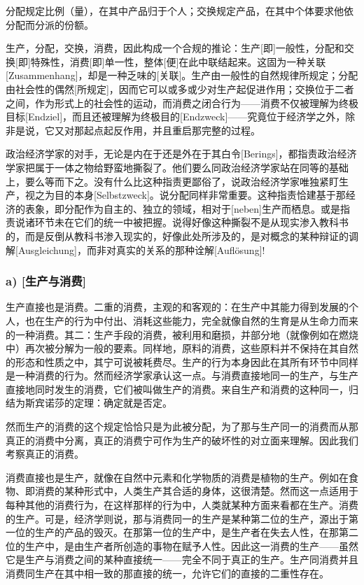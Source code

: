 \documentclass[a5paper,twoside,10.5pt]{ctexart}
\begin{document}
分配规定比例（量），在其中产品归于个人；交换规定产品，在其中个体要求他依分配而分派的份额。

生产，分配，交换，消费，因此构成一个合规的推论：生产[即]一般性，分配和交换[即]特殊性，消费[即]单一性，整体[便]在此中联结起来。这固为一种关联[Zusammenhang]，却是一种乏味的[关联]。生产由一般性的自然规律所规定；分配由社会性的偶然[所规定]，因而它可以或多或少对生产起促进作用；交换位于二者之间，作为形式上的社会性的运动，而消费之闭合行为——消费不仅被理解为终极目标[Endziel]，而且还被理解为终极目的[Endzweck]——究竟位于经济学之外，除非是说，它又对那起点起反作用，并且重启那完整的过程。

政治经济学家的对手，无论是内在于还是外在于其白令[Berings]，都指责政治经济学家把属于一体之物给野蛮地撕裂了。他们要么同政治经济学家站在同等的基础上，要么等而下之。没有什么比这种指责更鄙俗了，说政治经济学家唯独紧盯生产，视之为目的本身[Selbstzweck]。说分配同样非常重要。这种指责恰建基于那经济的表象，即分配作为自主的、独立的领域，相对于[neben]生产而栖息。或是指责说诸环节未在它们的统一中被把握。说得好像这种撕裂不是从现实渗入教科书的，而是反倒从教科书渗入现实的，好像此处所涉及的，是对概念的某种辩证的调解[Ausgleichung]，而非对真实的关系的那种诠解[Auflösung]!

\subsubsection{a) [生产与消费]}

生产直接也是消费。二重的消费，主观的和客观的：在生产中其能力得到发展的个人，也在生产的行为中付出、消耗这些能力，完全就像自然的生育是从生命力而来的一种消费。其二：生产手段的消费，被利用和磨损，并部分地（就像例如在燃烧中）再次被分解为一般的要素。同样地，原料的消费，这些原料并不保持在其自然的形态和性质之中，其宁可说被耗费尽。生产的行为本身因此在其所有环节中同样是一种消费的行为。然而经济学家承认这一点。与消费直接地同一的生产，与生产直接地同时发生的消费，它们被叫做生产的消费。来自生产和消费的这种同一，归结为斯宾诺莎的定理：确定就是否定。

然而生产的消费的这个规定恰恰只是为此被分配，为了那与生产同一的消费而从那真正的消费中分离，真正的消费宁可作为生产的破坏性的对立面来理解。因此我们考察真正的消费。

消费直接也是生产，就像在自然中元素和化学物质的消费是植物的生产。例如在食物、即消费的某种形式中，人类生产其合适的身体，这很清楚。然而这一点适用于每种其他的消费行为，在这样那样的行为中，人类就某种方面来看都在生产。消费的生产。可是，经济学则说，那与消费同一的生产是某种第二位的生产，源出于第一位的生产的产品的毁灭。在那第一位的生产中，是生产者在失去人性，在那第二位的生产中，是由生产者所创造的事物在赋予人性。因此这一消费的生产——虽然它是生产与消费之间的某种直接统一——完全不同于真正的生产。生产同消费并且消费同生产在其中相一致的那直接的统一，允许它们的直接的二重性存在。
\end{document}
